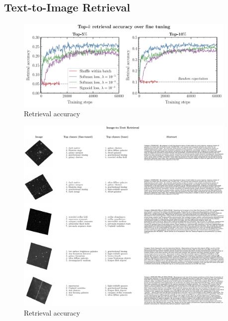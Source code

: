 \documentclass[10pt]{article} %
\begin{document}
\subsection{Text-to-Image Retrieval}
\label{sec:tti}


\cite{Hinton06}

\begin{figure}[!h]
\includegraphics[width=0.95\textwidth]{plots/retrieval_acc.pdf}
\caption{Retrieval accuracy}
\label{fig:retrieval_acc}
\end{figure}

\begin{figure}[!h]
\includegraphics[width=0.95\textwidth]{plots/itt.pdf}
\caption{Retrieval accuracy}
\label{fig:itt}
\end{figure}
\end{document}
